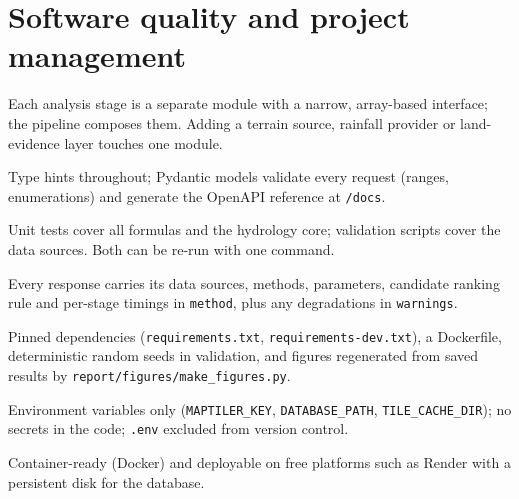 \documentclass[11pt,a4paper]{article}
\newcommand{\code}[1]{\texttt{\small #1}}
\begin{document}
\section{Software quality and project management}
\begin{description}[style=nextline,leftmargin=1.2em]
  \item[Modularity] Each analysis stage is a separate module with a narrow, array-based
        interface; the pipeline composes them. Adding a terrain source, rainfall provider or
        land-evidence layer touches one module.
  \item[Typing and validation] Type hints throughout; Pydantic models validate every request
        (ranges, enumerations) and generate the OpenAPI reference at \code{/docs}.
  \item[Testing] Unit tests cover all formulas and the hydrology core; validation scripts cover
        the data sources. Both can be re-run with one command.
  \item[Traceability] Every response carries its data sources, methods, parameters, candidate
        ranking rule and per-stage timings in \code{method}, plus any degradations in
        \code{warnings}.
  \item[Reproducibility] Pinned dependencies (\code{requirements.txt},
        \code{requirements-dev.txt}), a Dockerfile, deterministic random seeds in validation,
        and figures regenerated from saved results by \code{report/figures/make\_figures.py}.
  \item[Configuration] Environment variables only (\code{MAPTILER\_KEY},
        \code{DATABASE\_PATH}, \code{TILE\_CACHE\_DIR}); no secrets in the code; \code{.env}
        excluded from version control.
  \item[Deployment] Container-ready (Docker) and deployable on free platforms such as Render
        with a persistent disk for the database.
\end{description}

\end{document}
